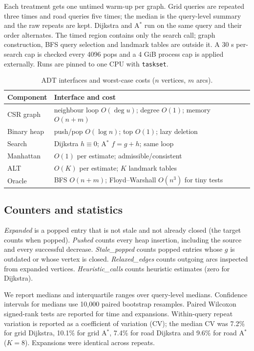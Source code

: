 \documentclass[conference,10pt]{IEEEtran}
\newcommand{\Astar}{A$^\ast$}
\newcommand{\code}[1]{\texttt{#1}}
\begin{document}
Each treatment gets one untimed warm-up per graph.  Grid queries are repeated
three times and road queries five times; the median is the query-level summary
and the raw repeats are kept.  Dijkstra and \Astar{} run on the same query and
their order alternates.  The timed region contains only the search call;
graph construction, BFS query selection and landmark tables are outside it.
A 30 s per-search cap is checked every 4096 pops and a 4 GiB process cap is
applied externally.  Runs are pinned to one CPU with \code{taskset}.

\begin{table}[!t]
\centering
\caption{ADT interfaces and worst-case costs ($n$ vertices, $m$ arcs).}
\label{tab:adt}
\footnotesize
\setlength{\tabcolsep}{3pt}
\begin{tabular}{p{2.6cm}p{3.7cm}}
\toprule
Component & Interface and cost\\
\midrule
CSR graph & neighbour loop $O(\deg u)$; degree $O(1)$; memory $O(n+m)$\\
Binary heap & push/pop $O(\log n)$; top $O(1)$; lazy deletion\\
Search & Dijkstra $h\equiv0$; \Astar{} $f=g+h$; same loop\\
Manhattan & $O(1)$ per estimate; admissible/consistent\\
ALT & $O(K)$ per estimate; $K$ landmark tables\\
Oracle & BFS $O(n+m)$; Floyd--Warshall $O(n^3)$ for tiny tests\\
\bottomrule
\end{tabular}
\end{table}

\subsection{Counters and statistics}
\emph{Expanded} is a popped entry that is not stale and not already closed
(the target counts when popped).  \emph{Pushed} counts every heap insertion,
including the source and every successful decrease.  \emph{Stale\_popped}
counts popped entries whose $g$ is outdated or whose vertex is closed.
\emph{Relaxed\_edges} counts outgoing arcs inspected from expanded vertices.
\emph{Heuristic\_calls} counts heuristic estimates (zero for Dijkstra).

We report medians and interquartile ranges over query-level medians.  Confidence
intervals for medians use 10,000 paired bootstrap resamples.  Paired Wilcoxon
signed-rank tests are reported for time and expansions.  Within-query repeat
variation is reported as a coefficient of variation (CV); the median CV was
7.2\% for grid Dijkstra, 10.1\% for grid \Astar{}, 7.4\% for road Dijkstra and
9.6\% for road \Astar{} ($K=8$).  Expansions were identical across repeats.
\end{document}
